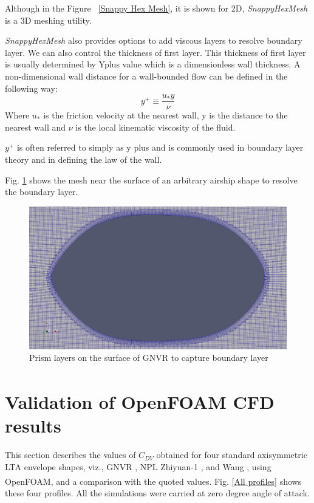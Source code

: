 Although in the Figure ~\ref{Snappy Hex Mesh}, it is shown for 2D, \textit{SnappyHexMesh} is a 3D meshing utility.

\textit{SnappyHexMesh} also provides options to add viscous layers to resolve boundary layer. We can also control the thickness of first layer. This thickness of first layer is usually determined by Yplus value which is a dimensionless wall thickness.
A non-dimensional wall distance for a wall-bounded flow can be defined in the following way:
\begin{equation}
y^{+} \equiv \dfrac{u_{*} y}{\nu}
\end{equation}
Where $ u_{*} $ is the friction velocity at the nearest wall, y is the distance to the nearest wall and $ \nu $ is the local kinematic viscosity of the fluid.

$ y^+ $ is often referred to simply as y plus and is commonly used in boundary layer theory and in defining the law of the wall.

Fig. \ref{prismlayers} shows the mesh near the surface of an arbitrary airship shape to resolve the boundary layer.
\begin{figure}[H]
	\centering
	\includegraphics[width=300 pt]{rnd/viscous_layers.png}
	\caption{Prism layers on the surface of GNVR to capture boundary layer}
	\label{prismlayers} %
\end{figure}

\section{Validation of OpenFOAM\textsuperscript{\textregistered} CFD results}
\label{results}

This section describes the values of $C_{DV}$ obtained for four standard axisymmetric LTA envelope shapes, viz., GNVR \cite{Ram}, NPL \cite{cheeseman2012} Zhiyuan-1 \cite{zhiyuan}, and Wang \cite{Wangshape}, using OpenFOAM\textsuperscript{\textregistered}, and a comparison with the quoted values. 
Fig. \ref{All profiles} shows these four profiles. All the simulations were carried at zero degree angle of attack.

